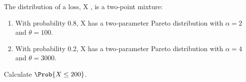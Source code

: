  The distribution of a loss, X , is a two-point mixture:
\begin{enumerate}
\item With probability 0.8, X has a two-parameter Pareto distribution with
 $\alpha=2$ and $\theta=100$.
\item With probability 0.2, X has a two-parameter Pareto distribution with
 $\alpha=4$ and $\theta=3000$.
\end{enumerate}
Calculate $\Prob{X \leq 200}$.




